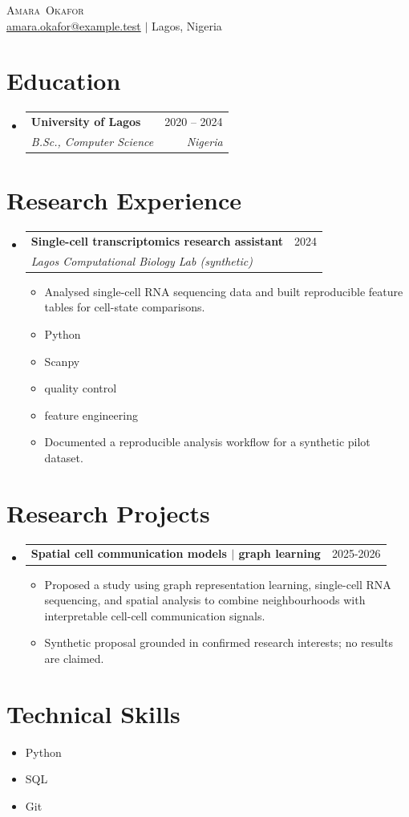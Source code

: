 \documentclass[letterpaper,11pt]{article}
\makeatletter
\newcommand{\resumeItem}[1]{
  \item\small{
    {#1 \vspace{-2pt}}
  }
}
\newcommand{\resumeSubheading}[4]{
  \vspace{-2pt}\item
    \begin{tabular*}{0.97\textwidth}[t]{l@{\extracolsep{\fill}}r}
      \textbf{#1} & #2 \\
      \textit{\small#3} & \textit{\small #4} \\
    \end{tabular*}\vspace{-7pt}
}
\newcommand{\resumeProjectHeading}[2]{
  \item
    \begin{tabular*}{0.97\textwidth}[t]{l@{\extracolsep{\fill}}r}
      \small#1 & #2 \\
    \end{tabular*}\vspace{-7pt}
}
\newcommand{\resumeSubHeadingListStart}{\begin{itemize}[leftmargin=0.15in, label={}]}
\newcommand{\resumeSubHeadingListEnd}{\end{itemize}}
\newcommand{\resumeItemListStart}{\begin{itemize}}
\newcommand{\resumeItemListEnd}{\end{itemize}\vspace{-5pt}}
\makeatother
\begin{document}

\begin{center}
    {\Huge \scshape \mbox{Amara Okafor}} \\
    \small \href{mailto:amara.okafor@example.test}{amara.okafor@example.test} $|$ Lagos, Nigeria
\end{center}

\section{Education}
\resumeSubHeadingListStart
\resumeSubheading{University of Lagos}{2020 -- 2024}{B.Sc., Computer Science}{Nigeria}
\resumeSubHeadingListEnd

\section{Research Experience}
\resumeSubHeadingListStart
\resumeSubheading{Single-cell transcriptomics research assistant}{2024}{Lagos Computational Biology Lab (synthetic)}{}
\resumeItemListStart
\resumeItem{Analysed single-cell RNA sequencing data and built reproducible feature tables for cell-state comparisons.}
\resumeItem{Python}
\resumeItem{Scanpy}
\resumeItem{quality control}
\resumeItem{feature engineering}
\resumeItem{Documented a reproducible analysis workflow for a synthetic pilot dataset.}
\resumeItemListEnd
\resumeSubHeadingListEnd

\section{Research Projects}
\resumeSubHeadingListStart
\resumeProjectHeading{\textbf{Spatial cell communication models $|$ graph learning}}{2025-2026}
\resumeItemListStart
\resumeItem{Proposed a study using graph representation learning, single-cell RNA sequencing, and spatial analysis to combine neighbourhoods with interpretable cell-cell communication signals.}
\resumeItem{Synthetic proposal grounded in confirmed research interests; no results are claimed.}
\resumeItemListEnd
\resumeSubHeadingListEnd

\section{Technical Skills}
\resumeSubHeadingListStart
\resumeItem{Python}
\resumeItem{SQL}
\resumeItem{Git}
\resumeSubHeadingListEnd
\end{document}
